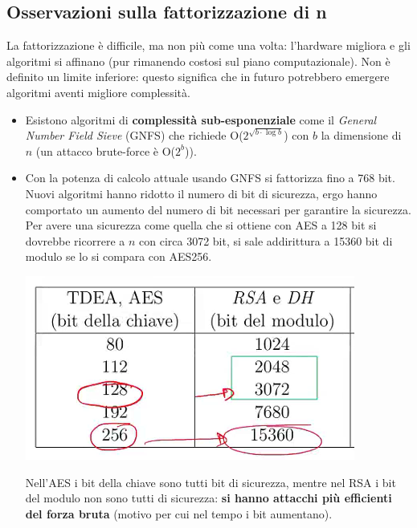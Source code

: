 \subsection{Osservazioni sulla fattorizzazione di n}
La fattorizzazione è difficile, ma non più come una volta: l'hardware migliora e gli algoritmi si affinano (pur rimanendo costosi sul piano computazionale). Non è definito un limite inferiore: questo significa che in futuro potrebbero emergere algoritmi aventi migliore complessità.
\begin{itemize}
    \item Esistono algoritmi di \textbf{complessità sub-esponenziale} come il \emph{General Number Field Sieve} (GNFS) che richiede O($2^{\sqrt{b \cdot \log b}}$) con $b$ la dimensione di $n$ (un attacco brute-force è O($2^b$)).
    \item Con la potenza di calcolo attuale usando GNFS si fattorizza fino a 768 bit. Nuovi algoritmi hanno ridotto il numero di bit di sicurezza, ergo hanno comportato un aumento del numero di bit necessari per garantire la sicurezza. Per avere una sicurezza come quella che si ottiene con AES a 128 bit si dovrebbe ricorrere a $n$ con circa 3072 bit, si sale addirittura a 15360 bit di modulo se lo si compara con AES256.
    \begin{center}
    	\includegraphics[scale=.8]{images/25.PNG}
    \end{center}
    Nell'AES i bit della chiave sono tutti bit di sicurezza, mentre nel RSA i bit del modulo non sono tutti di sicurezza: \textbf{si hanno attacchi più efficienti del forza bruta} (motivo per cui nel tempo i bit aumentano).
\end{itemize}

